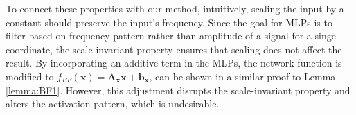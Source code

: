 
To connect these properties with our method, intuitively, scaling the input by a constant should preserve the input's frequency. Since the goal for MLPs is to filter based on frequency pattern rather than amplitude of a signal for a singe coordinate, the scale-invariant property ensures that scaling does not affect the result. By incorporating an additive term in the MLPs, the network function is modified to \( f_{BF}(\mathbf{x}) = \mathbf{A}_\mathbf{x} \mathbf{x} + \mathbf{b}_\mathbf{x} \), can be shown in a similar proof to Lemma \ref{lemma:BF1}. However, this adjustment disrupts the scale-invariant property and alters the activation pattern, which is undesirable.
